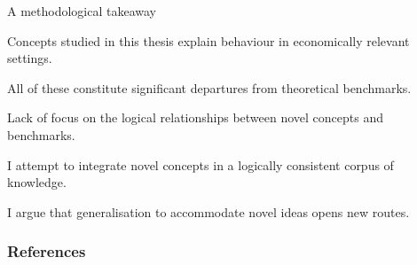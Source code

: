 \documentclass[usenames,dvipsnames,aspectratio=169,11pt,handout]{beamer}
\begin{document}
\begin{frame}{A methodological takeaway}

	Concepts studied in this thesis explain behaviour in economically relevant settings.

	\vfill

	All of these constitute significant departures from theoretical benchmarks.

	\vfill

	Lack of focus on the logical relationships between novel concepts and benchmarks.

	\vfill

	I attempt to integrate novel concepts in a logically consistent corpus of knowledge.

	\vfill

	I argue that generalisation to accommodate novel ideas opens new routes.

\end{frame}

\begin{frame}

	\frametitle{References}

	
	


\end{frame}
\end{document}
